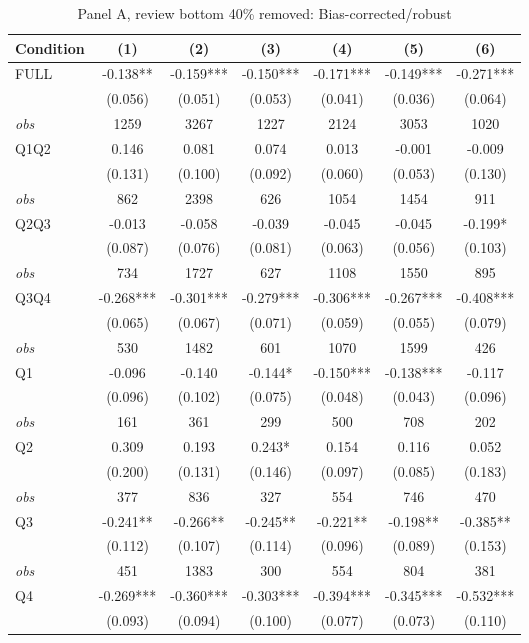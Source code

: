 \begin{table}[!htbp]
\centering
\caption{Panel A, review bottom 40\% removed: Bias-corrected/robust}
\begin{tabular}{lcccccc}
\toprule
Condition & (1) & (2) & (3) & (4) & (5) & (6) \\
\midrule
FULL & -0.138** & -0.159*** & -0.150*** & -0.171*** & -0.149*** & -0.271*** \\
 & (0.056) & (0.051) & (0.053) & (0.041) & (0.036) & (0.064) \\
\textit{obs} & 1259 & 3267 & 1227 & 2124 & 3053 & 1020 \\
Q1Q2 & 0.146 & 0.081 & 0.074 & 0.013 & -0.001 & -0.009 \\
 & (0.131) & (0.100) & (0.092) & (0.060) & (0.053) & (0.130) \\
\textit{obs} & 862 & 2398 & 626 & 1054 & 1454 & 911 \\
Q2Q3 & -0.013 & -0.058 & -0.039 & -0.045 & -0.045 & -0.199* \\
 & (0.087) & (0.076) & (0.081) & (0.063) & (0.056) & (0.103) \\
\textit{obs} & 734 & 1727 & 627 & 1108 & 1550 & 895 \\
Q3Q4 & -0.268*** & -0.301*** & -0.279*** & -0.306*** & -0.267*** & -0.408*** \\
 & (0.065) & (0.067) & (0.071) & (0.059) & (0.055) & (0.079) \\
\textit{obs} & 530 & 1482 & 601 & 1070 & 1599 & 426 \\
Q1 & -0.096 & -0.140 & -0.144* & -0.150*** & -0.138*** & -0.117 \\
 & (0.096) & (0.102) & (0.075) & (0.048) & (0.043) & (0.096) \\
\textit{obs} & 161 & 361 & 299 & 500 & 708 & 202 \\
Q2 & 0.309 & 0.193 & 0.243* & 0.154 & 0.116 & 0.052 \\
 & (0.200) & (0.131) & (0.146) & (0.097) & (0.085) & (0.183) \\
\textit{obs} & 377 & 836 & 327 & 554 & 746 & 470 \\
Q3 & -0.241** & -0.266** & -0.245** & -0.221** & -0.198** & -0.385** \\
 & (0.112) & (0.107) & (0.114) & (0.096) & (0.089) & (0.153) \\
\textit{obs} & 451 & 1383 & 300 & 554 & 804 & 381 \\
Q4 & -0.269*** & -0.360*** & -0.303*** & -0.394*** & -0.345*** & -0.532*** \\
 & (0.093) & (0.094) & (0.100) & (0.077) & (0.073) & (0.110) \\

\end{tabular}
\end{table}
